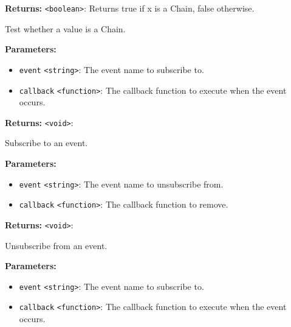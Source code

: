 \documentclass[12pt,a4paper]{article}
\begin{document}
\noindent \textbf{Returns:} \texttt{<boolean>}: Returns true if \textasciigrave{}x\textasciigrave{} is a Chain, false otherwise.

\noindent Test whether a value is a Chain.

\vspace{5mm}
\noindent {}


\noindent \textbf{Parameters:}
\begin{itemize}
  \item \texttt{event} \texttt{<string>}: The event name to subscribe to.
  \item \texttt{callback} \texttt{<function>}: The callback function to execute when the event occurs.
\end{itemize}

\noindent \textbf{Returns:} \texttt{<void>}: 

\noindent Subscribe to an event.

\vspace{5mm}
\noindent {}


\noindent \textbf{Parameters:}
\begin{itemize}
  \item \texttt{event} \texttt{<string>}: The event name to unsubscribe from.
  \item \texttt{callback} \texttt{<function>}: The callback function to remove.
\end{itemize}

\noindent \textbf{Returns:} \texttt{<void>}: 

\noindent Unsubscribe from an event.

\vspace{5mm}
\noindent {}


\noindent \textbf{Parameters:}
\begin{itemize}
  \item \texttt{event} \texttt{<string>}: The event name to subscribe to.
  \item \texttt{callback} \texttt{<function>}: The callback function to execute when the event occurs.
\end{itemize}
\end{document}
